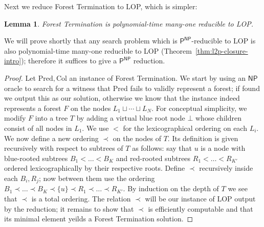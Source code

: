 \documentclass[11pt]{article}
\newtheorem{lemma}{Lemma}
\begin{document}
Next we reduce Forest Termination to LOP, which is simpler:
\begin{lemma}\label{lem:forest-lop}
Forest Termination is polynomial-time many-one reducible to LOP.
\end{lemma}
We will prove shortly that any search problem which is $\mathsf{P^{NP}}$-reducible to LOP is also polynomial-time many-one reducible to LOP (Theorem~\ref{thm:l2p-closure-intro}); therefore it suffices to give a $\mathsf{P^{NP}}$ reduction.
\begin{proof}
Let $\mathrm{Pred},\mathrm{Col}$ an instance of Forest Termination. We start by using an $\mathsf{NP}$ oracle to search for a witness that $\mathrm{Pred}$ fails to validly represent a forest; if found we output this as our solution, otherwise we know that the instance indeed represents a forest $F$ on the nodes $L_1 \sqcup \cdots \sqcup L_N$. For conceptual simplicity, we modify $F$ into a tree $T$ by adding a virtual blue root node $\bot$ whose children consist of all nodes in $L_1$. We use $<$ for the lexicographical ordering on each $L_i$. We now define a new ordering $\prec$ on the nodes of $T$. Its definition is given recursively with respect to subtrees of $T$ as follows: say that $u$ is a node with blue-rooted subtrees $B_1 < \ldots < B_K$ and red-rooted subtrees $R_1<\ldots<R_{K'}$ ordered lexicographically by their respective roots. Define $\prec$ recursively inside each $B_i, R_j$; now between them use the ordering $B_1 \prec \ldots \prec B_K \prec \{u\} \prec R_1 \prec \ldots \prec R_{K'}$. By induction on the depth of $T$ we see that $\prec$ is a total ordering. The relation $\prec$ will be our instance of LOP output by the reduction; it remains to show that $\prec$ is efficiently computable and that its minimal element yeilds a Forest Termination solution.


\end{proof}
\end{document}

